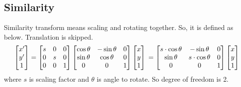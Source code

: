 \documentclass{article}
\begin{document}
\subsection{Similarity}
Similarity transform means scaling and rotating together. So, it is defined as below. Translation is skipped.
$$
\begin{bmatrix}
x' \\ y' \\ 1
\end{bmatrix}
=
\begin{bmatrix}
s & 0 & 0 \\
0 & s & 0 \\
0 & 0 & 1
\end{bmatrix}
\begin{bmatrix}
\cos\theta & -\sin\theta & 0 \\
\sin\theta & \cos\theta & 0 \\
0 & 0 & 1
\end{bmatrix}
\begin{bmatrix}
x \\ y \\ 1
\end{bmatrix}
\\
= \begin{bmatrix}
s\cdot \cos\theta & -\sin\theta & 0 \\
\sin\theta & s\cdot \cos\theta & 0 \\
0 & 0 & 1
\end{bmatrix}
\begin{bmatrix}
x \\ y \\ 1
\end{bmatrix}
$$
where $s$ is scaling factor and $\theta$ is angle to rotate. So degree of freedom is 2.
\end{document}
